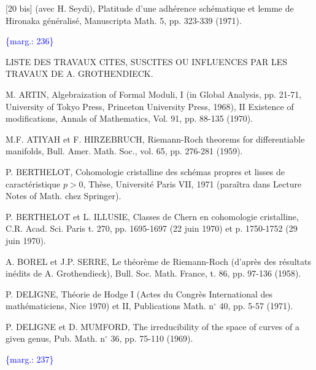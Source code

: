 \documentclass[11pt]{article}
\newcommand{\scanpage}[1]{\par\bigskip\noindent{\small\sffamily[scan #1]}\par}
\newcommand{\mspage}[1]{{\small\sffamily[p.\,#1]}}
\newcommand{\margin}[1]{\textcolor{blue}{\{\textsf{marg.:} #1\}}}
\begin{document}
[20 bis] (avec H. Seydi), Platitude d'une adhérence
schématique et lemme de Hironaka généralisé,
Manuscripta Math. 5, pp. 323-339 (1971).

\margin{236}

\clearpage
\scanpage{119/237}
\mspage{- 25 -}

LISTE DES TRAVAUX CITES, SUSCITES OU INFLUENCES PAR
LES TRAVAUX DE A. GROTHENDIECK.

M. ARTIN, Algebraization of Formal Moduli, I (in
Global Analysis, pp. 21-71, University
of Tokyo Press, Princeton University Press,
1968), II Existence of modifications,
Annals of Mathematics, Vol. 91, pp. 88-135
(1970).

M.F. ATIYAH et F. HIRZEBRUCH, Riemann-Roch theorems
for differentiable manifolds, Bull. Amer.
Math. Soc., vol. 65, pp. 276-281 (1959).

P. BERTHELOT, Cohomologie cristalline des schémas
propres et lisses de caractéristique $p > 0$,
Thèse, Université Paris VII, 1971 (paraîtra
dans Lecture Notes of Math. chez Springer).

P. BERTHELOT et L. ILLUSIE, Classes de Chern en
cohomologie cristalline, C.R. Acad. Sci.
Paris t. 270, pp. 1695-1697 (22 juin 1970)
et p. 1750-1752 (29 juin 1970).

A. BOREL et J.P. SERRE, Le théorème de Riemann-Roch
(d'après des résultats inédits de
A. Grothendieck), Bull. Soc. Math. France,
t. 86, pp. 97-136 (1958).

P. DELIGNE, Théorie de Hodge I (Actes du Congrès
International des mathématiciens, Nice 1970)
et II, Publications Math. n$^\circ$ 40, pp. 5-57
(1971).

P. DELIGNE et D. MUMFORD, The irreducibility of
the space of curves of a given genus,
Pub. Math. n$^\circ$ 36, pp. 75-110 (1969).

\margin{237}

\clearpage
\scanpage{119/238}
\mspage{- 26 -}
\end{document}
